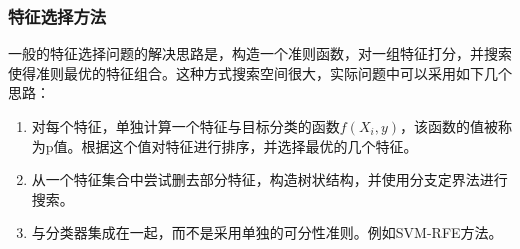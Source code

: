 \subsubsection{特征选择方法}
	一般的特征选择问题的解决思路是，构造一个准则函数，对一组特征打分，并搜索使得准则最优的特征组合。这种方式搜索空间很大，实际问题中可以采用如下几个思路：
	\begin{enumerate}
	\item 对每个特征，单独计算一个特征与目标分类的函数$f(X_i, y)$，该函数的值被称为p值。根据这个值对特征进行排序，并选择最优的几个特征。
	\item 从一个特征集合中尝试删去部分特征，构造树状结构，并使用分支定界法进行搜索。
	\item 与分类器集成在一起，而不是采用单独的可分性准则。例如{\ttfamily SVM-RFE}方法。
	\end{enumerate}

